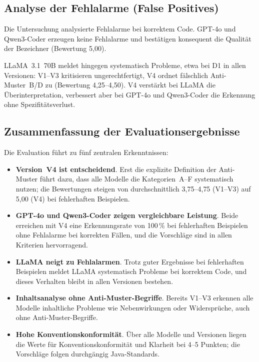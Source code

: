 \documentclass[a4paper,12pt]{article}
\begin{document}
\subsection{Analyse der Fehlalarme (False Positives)}

Die Untersuchung analysierte Fehlalarme bei korrektem Code. GPT-4o und Qwen3-Coder erzeugen keine Fehlalarme und bestätigen konsequent die Qualität der Bezeichner (Bewertung 5{,}00).

LLaMA~3.1~70B meldet hingegen systematisch Probleme, etwa bei D1 in allen Versionen: V1--V3 kritisieren ungerechtfertigt, V4 ordnet fälschlich Anti-Muster~B/D zu (Bewertung 4{,}25--4{,}50). V4 verstärkt bei LLaMA die Überinterpretation, verbessert aber bei GPT-4o und Qwen3-Coder die Erkennung ohne Spezifitätsverlust.

\subsection{Zusammenfassung der Evaluationsergebnisse}

Die Evaluation führt zu fünf zentralen Erkenntnissen:%
\begin{itemize}
    \item \textbf{Version~V4 ist entscheidend}. Erst die explizite Definition der Anti-Muster führt dazu, dass alle Modelle die Kategorien~A--F systematisch nutzen; die Bewertungen steigen von durchschnittlich 3{,}75--4{,}75 (V1--V3) auf 5{,}00 (V4) bei fehlerhaften Beispielen.%
    \item \textbf{GPT-4o und Qwen3-Coder zeigen vergleichbare Leistung}. Beide erreichen mit V4 eine Erkennungsrate von 100\,\% bei fehlerhaften Beispielen ohne Fehlalarme bei korrekten Fällen, und die Vorschläge sind in allen Kriterien hervorragend.%
    \item \textbf{LLaMA neigt zu Fehlalarmen}. Trotz guter Ergebnisse bei fehlerhaften Beispielen meldet LLaMA systematisch Probleme bei korrektem Code, und dieses Verhalten bleibt in allen Versionen bestehen.%
    \item \textbf{Inhaltsanalyse ohne Anti-Muster-Begriffe}. Bereits V1--V3 erkennen alle Modelle inhaltliche Probleme wie Nebenwirkungen oder Widersprüche, auch ohne Anti-Muster-Begriffe.%
    \item \textbf{Hohe Konventionskonformität}. Über alle Modelle und Versionen liegen die Werte für Konventionskonformität und Klarheit bei 4--5 Punkten; die Vorschläge folgen durchgängig Java-Standards.%
\end{itemize}
\end{document}
